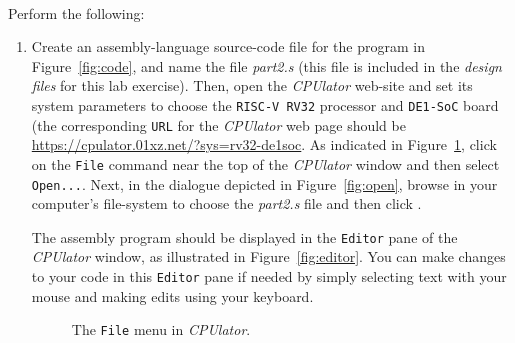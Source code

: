\documentclass[epsfig,10pt,fullpage]{article}
\begin{document}
~\\
\noindent
Perform the following:

\setlength{\fboxsep}{1pt}
\begin{enumerate}
\item Create an assembly-language source-code file for the program in
Figure~\ref{fig:code}, and name the file {\it part2.s} (this file is included in 
the {\it design files} for this lab exercise).
Then, open the {\it CPUlator} web-site and set its system parameters to choose the
\texttt{RISC-V RV32} processor and \texttt{DE1-SoC} board (the corresponding \texttt{URL} for 
the {\it CPUlator} web page should be {\href{https://cpulator.01xz.net/?sys=rv32-de1soc}
{https://cpulator.01xz.net/?sys=rv32-de1soc}}.
As indicated in Figure~\ref{fig:file}, click on the \texttt{File} command near the top of 
the {\it CPUlator} window and then select \texttt{Open...}. Next, in the dialogue depicted in 
Figure~\ref{fig:open}, browse in your computer's file-system to choose 
the {\it part2.s} file and then click .

\noindent
 The assembly program should be
displayed in the \texttt{Editor} pane of the {\it CPUlator} window, as illustrated in 
Figure~\ref{fig:editor}. You can make changes to your code in this \texttt{Editor} pane
if needed by simply selecting text with your mouse and making edits using your keyboard.

\begin{figure}[H]
	\begin{center}
    \setlength{\fboxsep}{0pt}
	\end{center}
	\caption{The \texttt{File} menu in {\it CPUlator}.}
\label{fig:file}
\end{figure}


\end{enumerate}
\end{document}
